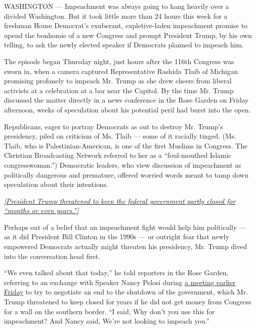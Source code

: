 WASHINGTON --- Impeachment was always going to hang heavily over a
divided Washington. But it took little more than 24 hours this week for
a freshman House Democrat's exuberant, expletive-laden impeachment
promise to upend the bonhomie of a new Congress and prompt President
Trump, by his own telling, to ask the newly elected speaker if Democrats
planned to impeach him.

The episode began Thursday night, just hours after the 116th Congress
was sworn in, when a camera captured Representative Rashida Tlaib of
Michigan promising profanely to impeach Mr. Trump as she drew cheers
from liberal activists at a celebration at a bar near the Capitol. By
the time Mr. Trump discussed the matter directly in a news conference in
the Rose Garden on Friday afternoon, weeks of speculation about his
potential peril had burst into the open.

Republicans, eager to portray Democrats as out to destroy Mr. Trump's
presidency, piled on criticism of Ms. Tlaib --- some of it racially
tinged. (Ms. Tlaib, who is Palestinian-American, is one of the first
Muslims in Congress. The Christian Broadcasting Network referred to her
as a ``foul-mouthed Islamic congresswoman.'') Democratic leaders, who
view discussion of impeachment as politically dangerous and premature,
offered worried words meant to tamp down speculation about their
intentions.

\href{https://www.nytimes.com/2019/01/04/us/politics/democrats-trump-meeting-government-shutdown.html?action=click\&module=Top\%20Stories\&pgtype=Homepage}{\emph{{[}President
Trump threatened to keep the federal government partly closed for
``months or even years.''{]}}}

Perhaps out of a belief that an impeachment fight would help him
politically --- as it did President Bill Clinton in the 1990s --- or
outright fear that newly empowered Democrats actually might threaten his
presidency, Mr. Trump dived into the conversation head first.

``We even talked about that today,'' he told reporters in the Rose
Garden, referring to an exchange with Speaker Nancy Pelosi during
\href{https://www.nytimes.com/2019/01/04/us/politics/democrats-trump-meeting-government-shutdown.html}{a
meeting earlier Friday} to try to negotiate an end to the shutdown of
the government, which Mr. Trump threatened to keep closed for years if
he did not get money from Congress for a wall on the southern border.
``I said, Why don't you use this for impeachment? And Nancy said, We're
not looking to impeach you.''


